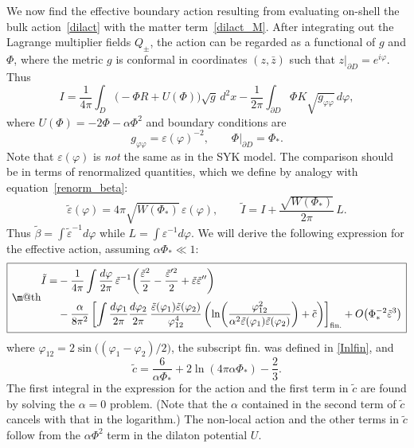 \documentclass[12pt]{article}
\makeatletter
\newcommand*{\wideboxed}[1]{\setlength{\fboxsep}{1ex}%
  \fbox{\m@th$\displaystyle#1$}}
\newcommand{\ph}{\varphi}
\newcommand{\vep}{\varepsilon}
\newcommand{\tvep}{\tilde{\varepsilon}}
\newcommand{\vp}{\varphi}
\makeatother
\begin{document}
We now find the effective boundary action resulting from evaluating on-shell the bulk action~\eqref{dilact} with the matter term~\eqref{dilact_M}. After integrating out the Lagrange multiplier fields $Q_{\pm}$, the action can be regarded as a functional of $g$ and $\Phi$, where the metric $g$ is conformal in coordinates $(z,\bar{z})$ such that $z|_{\partial D}=e^{i\vp}$. Thus
\begin{equation}\label{dilact1}
I=\frac{1}{4\pi}\int_{D} \bigl(-\Phi R+U(\Phi)\bigr)\sqrt{g}\,d^2x
-\frac{1}{2\pi}\int_{\partial D}\Phi K\sqrt{g_{\ph\ph}}\,d\ph,
\end{equation}
where $U(\Phi)= -2\Phi-\alpha\Phi^2$ and boundary conditions are 
\begin{equation} \label{diskbc}
g_{\vp\vp}=\vep(\vp)^{-2},\qquad
\Phi|_{\partial D}=\Phi_*.
\end{equation}
Note that $\vep(\vp)$ is \emph{not} the same as in the SYK model. The comparison should be in terms of renormalized quantities, which we define by analogy with equation~\eqref{renorm_beta}:
\begin{equation}
\tvep(\vp)=4\pi\sqrt{W(\Phi_*)}\,\vep(\vp),\qquad
\tilde{I}=I+\frac{\sqrt{W(\Phi_*)}}{2\pi}\,L.
\end{equation}
Thus $\tilde{\beta}=\int\tvep^{-1}d\vp$ while $L=\int\vep^{-1}d\vp$. We will derive the following expression for the effective action, assuming $\alpha\Phi_*\ll 1$:
\begin{equation}
\label{dilact_eff}
\wideboxed{
\begin{aligned}
\tilde{I} =
&-\frac{1}{4\pi} \int\frac{d\vp}{2\pi}\,\tvep^{-1}
\biggl(\frac{\tvep^2}{2}-\frac{\tvep'^2}{2}+\tvep\tvep''\biggr)
\\[3pt]
&-\frac{\alpha}{8\pi^2}\left[
\int\frac{d\vp_1}{2\pi}\frac{d\vp_2}{2\pi}\,
\frac{\tvep(\vp_1)\tvep(\vp_2)}{\vp_{12}^4}
\left(\ln\biggl(\frac{\vp_{12}^2}{\alpha^2\tvep(\vp_1)\tvep(\vp_2)}\biggr)
+\tilde{c}\right)\right]_{\text{fin.}}
+O\bigl(\Phi_*^{-2}\tvep^3\bigr)
\end{aligned}
}
\end{equation}
where $\vp_{12}=2\sin\bigl((\ph_1-\ph_2)/2\bigr)$, the subscript fin. was defined in \eqref{Inlfin}, and
\begin{equation}
\label{dilact_eff_c}
\tilde{c}=\frac{6}{\alpha\Phi_*}+2\ln(4\pi\alpha\Phi_*)-\frac{2}{3}.
\end{equation}
The first integral in the expression for the action and the first term in $\tilde{c}$ are found by solving the $\alpha=0$ problem. (Note that the $\alpha$ contained in the second term of $\tilde{c}$ cancels with that in the logarithm.) The non-local action and the other terms in $\tilde{c}$ follow from the $\alpha \Phi^2$ term in the dilaton potential $U$. 
\end{document}

